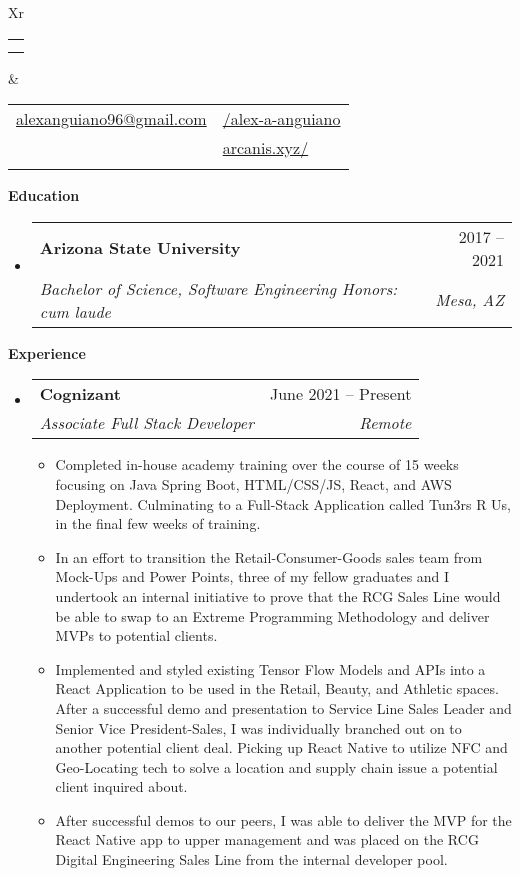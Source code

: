 \documentclass[letterpaper,12pt]{article}[leftmargin=*]
\makeatletter
\def \fullname {Alex Anguiano}
\def \subtitle {}
\def \linkedinicon {\faLinkedin}
\def \linkedinlink {https://www.linkedin.com/in/alex-a-anguiano/}
\def \linkedintext {/alex-a-anguiano}
\def \phoneicon {\faPhone}
\def \phonetext {+1-480-335-2816}
\def \emailicon {\faEnvelope}
\def \emaillink {mailto:alexanguiano96@gmail.com}
\def \emailtext {alexanguiano96@gmail.com}
\def \websiteicon {\faGlobe}
\def \websitelink {http://arcanis.xyz/}
\def \websitetext {arcanis.xyz/}
\def \headertype {\doublecol} %
\def \entryspacing {-0pt}
\def \linkedin {\linkedinicon \hspace{3pt}\href{\linkedinlink}{\linkedintext}}
\def \phone {\phoneicon \hspace{3pt}{ \phonetext}}
\def \email {\emailicon \hspace{3pt}\href{\emaillink}{\emailtext}}
\def \website {\websiteicon \hspace{3pt}\href{\websitelink}{\websitetext}}
\renewcommand{\section}[2]{\vspace{5pt}
  \colorbox{secondary}{\color{white}\raggedbottom\normalsize\textbf{{#1}{\hspace{7pt}#2}}}
}
\newcommand{\resumeEntryStart}{\begin{itemize}[leftmargin=2.5mm]}
\newcommand{\resumeEntryEnd}{\end{itemize}\vspace{\entryspacing}}
\newcommand{\resumeItemListStart}{\begin{itemize}[leftmargin=4.5mm]}
\newcommand{\resumeItemListEnd}{\end{itemize}}
\newcommand{\resumeItem}[1]{
  \item\small{
    {#1 \vspace{-2pt}}
  }
}
\newcommand{\resumeEntryTSDL}[4]{
  \vspace{-1pt}\item[]
    \begin{tabularx}{0.97\textwidth}{X@{\hspace{60pt}}r}
      \textbf{\color{primary}#1} & {\firabook\color{accent}\small#2} \\
      \textit{\color{accent}\small#3} & \textit{\color{accent}\small#4} \\
    \end{tabularx}\vspace{-6pt}
}
\newcommand{\doublecol}[6]{
  \begin{tabularx}{\textwidth}{Xr}
    {
      \begin{tabular}[c]{l}
        \fontsize{35}{45}\selectfont{\color{primary}{{\textbf{\fullname}}}} \\
        {\textit{\subtitle}} %
      \end{tabular}
    } & {
      \begin{tabular}[c]{l@{\hspace{1.5em}}l}
        {\small#4} & {\small#1} \\
        {\small#5} & {\small#2} \\
        {\small#6} & {\small#3}
      \end{tabular}
    }
  \end{tabularx}
}
\newcommand{\singlecol}[6]{
  \begin{tabularx}{\textwidth}{Xr}
    {
      \begin{tabular}[b]{l}
        \fontsize{35}{45}\selectfont{\color{primary}{{\textbf{\fullname}}}} \\
        {\textit{\subtitle}} %
      \end{tabular}
    } & {
      \begin{tabular}[c]{l}
        {\small#1} \\
        {\small#2} \\
        {\small#3} \\
        {\small#4} \\
        {\small#5} \\
        {\small#6}
      \end{tabular}
    }
  \end{tabularx}
}
\makeatother
\begin{document}


\headertype{\linkedin}{\website}{\phone}{\email}{}{} %
\vspace{-10pt} %

\section{\faGraduationCap}{Education}

  \resumeEntryStart
    \resumeEntryTSDL
      {Arizona State University}{2017 -- 2021}
      {Bachelor of Science, Software Engineering \quad Honors: cum laude }{Mesa, AZ}
  \resumeEntryEnd
  
\section{\faPieChart}{Experience}

  \resumeEntryStart
    \resumeEntryTSDL
      {Cognizant}{June 2021 -- Present}
      {Associate Full Stack Developer}{Remote}
    \resumeItemListStart
      \resumeItem {Completed in-house academy training over the course of 15 weeks focusing on Java Spring Boot, HTML/CSS/JS, React, and AWS Deployment. Culminating to a Full-Stack Application called Tun3rs R Us, in the final few weeks of training.}
      \resumeItem {In an effort to transition the Retail-Consumer-Goods sales team from Mock-Ups and Power Points, three of my fellow graduates and I undertook an internal initiative to prove that the RCG Sales Line would be able to swap to an Extreme Programming Methodology and deliver MVPs to potential clients.}
      \resumeItem {Implemented and styled existing Tensor Flow Models and APIs into a React Application to be used in the Retail, Beauty, and Athletic spaces. After a successful demo and presentation to Service Line Sales Leader and Senior Vice President-Sales, I was individually branched out on to another potential client deal. Picking up React Native to utilize NFC and Geo-Locating tech to solve a location and supply chain issue a potential client inquired about.}
      \resumeItem {After successful demos to our peers, I was able to deliver the MVP for the React Native app to upper management and was placed on the RCG Digital Engineering Sales Line from the internal developer pool.}
    \resumeItemListEnd
  \resumeEntryEnd
  
\end{document}
